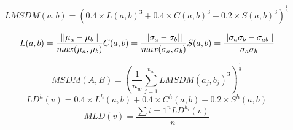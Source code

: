 
\begin{equation}
LMSDM(a,b) = (0.4\times L(a,b)^3+0.4\times C(a,b)^3+0.2\times S(a,b)^3)^{\frac{1}{3}}
\end{equation}

\begin{equation}
 L(a,b) = \frac{||\mu_a-\mu_b||}{max(\mu_a, \mu_b)}\\
 C(a,b) = \frac{||\sigma_a-\sigma_b||}{max(\sigma_a, \sigma_b)}\\
 S(a,b) = \frac{||\sigma_a\sigma_b -\sigma_{ab}||}{\sigma_a\sigma_b}
\end{equation}

\begin{equation}
MSDM(A,B) = (\frac{1}{n_w} \sum_{j=1}^{n_w}{LMSDM(a_j,b_j)^3})^{\frac{1}{3}}
\end{equation}
\begin{equation}
LD^h(v) = 0.4\times L^h(a,b)+0.4\times C^h(a,b)+0.2\times S^h(a,b)
\end{equation}
\begin{equation}
MLD(v) = \frac{\sum{i=1}^n{LD^{h_i}(v)}}{n}
\end{equation}